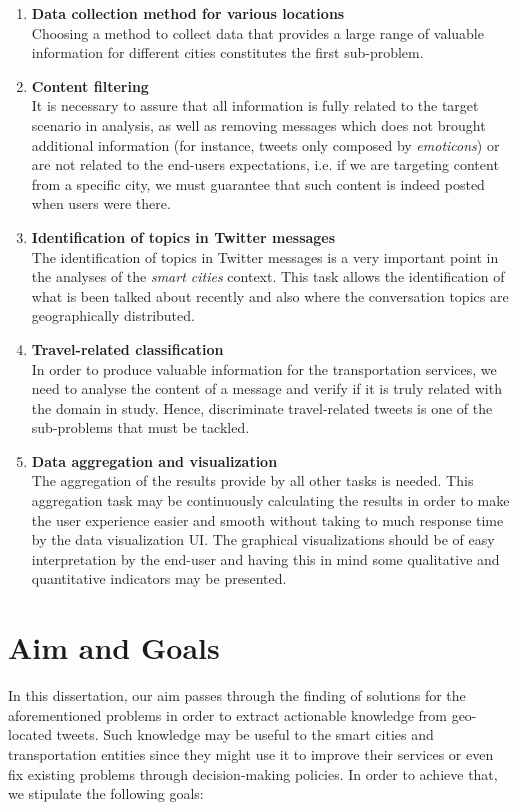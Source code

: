 \begin{enumerate}
	\item \textbf{Data collection method for various locations}\\Choosing a method to collect data that provides a large range of valuable information for different cities constitutes the first sub-problem.
	
	\item \textbf{Content filtering}\\It is necessary to assure that all information is fully related to the target scenario in analysis, as well as removing messages which does not brought additional information (for instance, tweets only composed by \textit{emoticons}) or are not related to the end-users expectations, i.e. if we are targeting content from a specific city, we must guarantee that such content is indeed posted when users were there.
	
	\item \textbf{Identification of topics in Twitter messages}\\The identification of topics in Twitter messages is a very important point in the analyses of the \textit{smart cities} context. This task allows the identification of what is been talked about recently and also where the conversation topics are geographically distributed.
	
	\item \textbf{Travel-related classification}\\In order to produce valuable information for the transportation services, we need to analyse the content of a message and verify if it is truly related with the domain in study. Hence, discriminate travel-related tweets is one of the sub-problems that must be tackled.
	
	\item \textbf{Data aggregation and visualization}\\The aggregation of the results provide by all other tasks is needed. This aggregation task may be continuously calculating the results in order to make the user experience easier and smooth without taking to much response time by the data visualization \gls{UI}. The graphical visualizations should be of easy interpretation by the end-user and having this in mind some qualitative and quantitative indicators may be presented.
\end{enumerate}
\fi

\section{Aim and Goals}\label{sec:aim_goals}
In this dissertation, our aim passes through the finding of solutions for the aforementioned problems in order to extract actionable knowledge from geo-located tweets. Such knowledge may be useful to the smart cities and transportation entities since they might use it to improve their services or even fix existing problems through decision-making policies. In order to achieve that, we stipulate the following goals:

